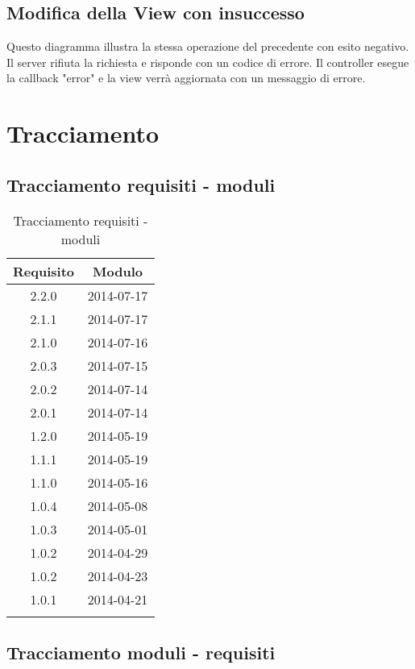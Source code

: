 \subsection{Modifica della View con insuccesso}
Questo diagramma illustra la stessa operazione del precedente con esito negativo. Il server rifiuta la richiesta e risponde con un codice di errore.
Il controller esegue la callback "error" e la view verrà aggiornata con un messaggio di errore.

\section{Tracciamento}
\label{sequenza}
\subsection{Tracciamento requisiti - moduli}
\begin{center}
\begin{longtable}{|c|c{0.5\linewidth}|}
\toprule
\textbf{Requisito} & \textbf{Modulo}\\


\midrule
2.2.0 & 2014-07-17\\

\midrule
2.1.1 & 2014-07-17\\

\midrule
2.1.0 & 2014-07-16\\

\midrule
2.0.3 & 2014-07-15\\

\midrule
2.0.2 & 2014-07-14\\

\midrule
2.0.1 & 2014-07-14\\

\midrule
1.2.0 & 2014-05-19\\
\midrule
1.1.1 & 2014-05-19\\
\midrule
1.1.0 & 2014-05-16\\
\midrule

1.0.4 & 2014-05-08\\
\midrule
1.0.3 & 2014-05-01\\
\midrule
1.0.2 & 2014-04-29\\
\midrule
1.0.2 & 2014-04-23\\
\midrule
1.0.1 & 2014-04-21\\

\bottomrule
\caption{Tracciamento requisiti - moduli}
\end{longtable}
\end{center}
\subsection{Tracciamento moduli - requisiti}

